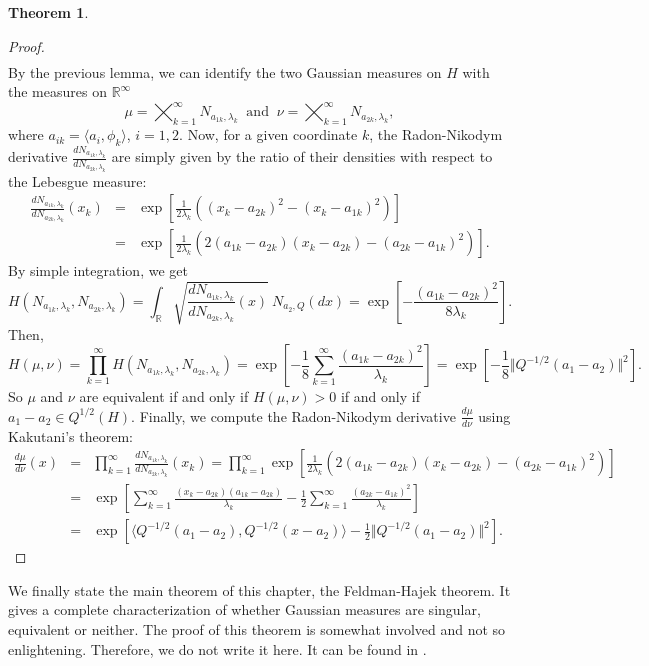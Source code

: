 \documentclass[10pt, a4paper]{report}
\newcommand{\R}[0]{\mathbb{R}}
\theoremstyle{definition}
\newtheorem{theorem}{Theorem}
\theoremstyle{remark}
\begin{document}
\begin{theorem}
\begin{proof}
\begin{eqnarray*}
		\end{eqnarray*}
		By the previous lemma, we can identify the two Gaussian measures on $H$ with the measures on $\R^\infty$
		$$\mu = \bigtimes_{k=1}^\infty N_{a_{1k},\lambda_k} \ \text{ and } \ \nu = \bigtimes_{k=1}^\infty N_{a_{2k},\lambda_k},$$
		where $a_{ik} = \langle a_i,\phi_k\rangle$, $i=1,2$.
		Now, for a given coordinate $k$, the Radon-Nikodym derivative $\frac{dN_{a_{1k},\lambda_k}}{dN_{a_{2k},\lambda_k}}$ are simply given by the ratio of their densities with respect to the Lebesgue measure:
		\begin{eqnarray*}
			\frac{dN_{a_{1k},\lambda_k}}{dN_{a_{2k},\lambda_k}}(x_k) & = & \exp\left[\frac{1}{2\lambda_k}\left((x_k-a_{2k})^2-(x_k-a_{1k})^2\right) \right]\\
			& = & \exp\left[\frac{1}{2\lambda_k}\left(2(a_{1k}-a_{2k})(x_k-a_{2k})-(a_{2k}-a_{1k})^2\right) \right].
		\end{eqnarray*}
		By simple integration, we get
		$$H(N_{a_{1k},\lambda_k},N_{a_{2k},\lambda_k}) = \int_{\R} \sqrt{\frac{dN_{a_{1k},\lambda_k}}{dN_{a_{2k},\lambda_k}}(x)} \ N_{a_2,Q}(dx) = \exp\left[-\frac{(a_{1k}-a_{2k})^2}{8\lambda_k}\right].$$
		Then,
		$$H(\mu,\nu) = \prod_{k=1}^\infty H(N_{a_{1k},\lambda_k},N_{a_{2k},\lambda_k}) = \exp\left[-\frac{1}{8}\sum_{k=1}^{\infty}\frac{(a_{1k}-a_{2k})^2}{\lambda_k} \right] = \exp\left[-\frac{1}{8}\Vert Q^{-1/2}(a_1-a_2) \Vert^2 \right].$$
		So $\mu$ and $\nu$ are equivalent if and only if $H(\mu,\nu)>0$ if and only if $a_1-a_2 \in Q^{1/2}(H)$. Finally, we compute the Radon-Nikodym derivative $\frac{d\mu}{d\nu}$ using Kakutani's theorem:
		\begin{eqnarray*}
			\frac{d\mu}{d\nu}(x) & = & \prod_{k=1}^\infty \frac{dN_{a_{1k},\lambda_k}}{dN_{a_{2k},\lambda_k}}(x_k) = \prod_{k=1}^{\infty} \exp\left[\frac{1}{2\lambda_k}\left(2(a_{1k}-a_{2k})(x_k-a_{2k})-(a_{2k}-a_{1k})^2\right) \right] \\
			& = & \exp\left[\sum_{k=1}^{\infty}\frac{(x_k-a_{2k})(a_{1k}-a_{2k})}{\lambda_k} - \frac{1}{2}\sum_{k=1}^{\infty}\frac{(a_{2k}-a_{1k})^2}{\lambda_k} \right]\\
			& = & \exp\left[\langle Q^{-1/2}(a_1-a_2),Q^{-1/2}(x-a_2)\rangle - \frac{1}{2} \Vert Q^{-1/2}(a_1-a_2)\Vert^2\right].
		\end{eqnarray*}
	\end{proof}
\end{theorem}
We finally state the main theorem of this chapter, the Feldman-Hajek theorem. It gives a complete characterization of whether Gaussian measures are singular, equivalent or neither. The proof of this theorem is somewhat involved and not so enlightening. Therefore, we do not write it here. It can be found in \cite[Theorem 2.25]{prato1}.
\end{document}
